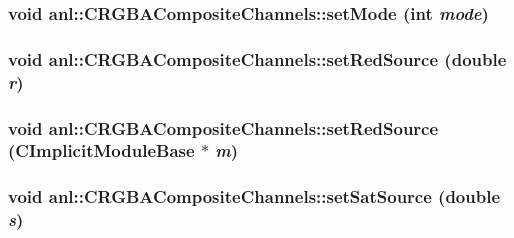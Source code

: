 \label{classanl_1_1CRGBACompositeChannels_a8e84b039216e4469b780122135dc686b}
\hypertarget{classanl_1_1CRGBACompositeChannels_a1ad032faa7ba877873e4f3ce73b0a7fc}{
\subsubsection[{setMode}]{\setlength{\rightskip}{0pt plus 5cm}void anl::CRGBACompositeChannels::setMode (int {\em mode})}}
\label{classanl_1_1CRGBACompositeChannels_a1ad032faa7ba877873e4f3ce73b0a7fc}
\hypertarget{classanl_1_1CRGBACompositeChannels_ad9cd624a17954c67fc0e2b881231e51f}{
\subsubsection[{setRedSource}]{\setlength{\rightskip}{0pt plus 5cm}void anl::CRGBACompositeChannels::setRedSource (double {\em r})}}
\label{classanl_1_1CRGBACompositeChannels_ad9cd624a17954c67fc0e2b881231e51f}
\hypertarget{classanl_1_1CRGBACompositeChannels_a0c7259e36768382246354da99861256a}{
\subsubsection[{setRedSource}]{\setlength{\rightskip}{0pt plus 5cm}void anl::CRGBACompositeChannels::setRedSource ({\bf CImplicitModuleBase} $\ast$ {\em m})}}
\label{classanl_1_1CRGBACompositeChannels_a0c7259e36768382246354da99861256a}
\hypertarget{classanl_1_1CRGBACompositeChannels_ae9a1eb914934acff7c7c0d94ef700a96}{
\subsubsection[{setSatSource}]{\setlength{\rightskip}{0pt plus 5cm}void anl::CRGBACompositeChannels::setSatSource (double {\em s})}}
